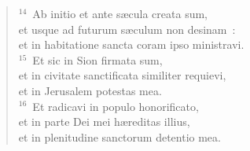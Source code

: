 \begin{verse}${}^{14}$~Ab initio et ante s\ae cula creata sum,\\ et usque ad futurum s\ae culum non desinam~:\\ et in habitatione sancta coram ipso ministravi.\\
${}^{15}$~Et sic in Sion firmata sum,\\ et in civitate sanctificata similiter requievi,\\ et in Jerusalem potestas mea.\\
${}^{16}$~Et radicavi in populo honorificato,\\ et in parte Dei mei h\ae reditas illius,\\ et in plenitudine sanctorum detentio mea.\end{verse}


